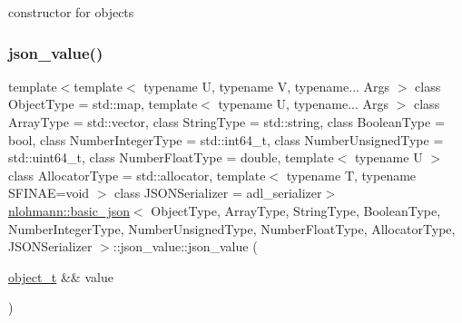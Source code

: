 constructor for objects 

\mbox{\label{unionnlohmann_1_1basic__json_1_1json__value_a82815d53bd7c983995fbcbe85131a110}} 
\subsubsection{\texorpdfstring{json\_value()}{json\_value()}\hspace{0.1cm}{\footnotesize\ttfamily [10/12]}}
{\footnotesize\ttfamily template$<$template$<$ typename U, typename V, typename... Args $>$ class Object\+Type = std\+::map, template$<$ typename U, typename... Args $>$ class Array\+Type = std\+::vector, class String\+Type  = std\+::string, class Boolean\+Type  = bool, class Number\+Integer\+Type  = std\+::int64\+\_\+t, class Number\+Unsigned\+Type  = std\+::uint64\+\_\+t, class Number\+Float\+Type  = double, template$<$ typename U $>$ class Allocator\+Type = std\+::allocator, template$<$ typename T, typename S\+F\+I\+N\+A\+E=void $>$ class J\+S\+O\+N\+Serializer = adl\+\_\+serializer$>$ \\
\mbox{\hyperlink{classnlohmann_1_1basic__json}{nlohmann\+::basic\+\_\+json}}$<$ Object\+Type, Array\+Type, String\+Type, Boolean\+Type, Number\+Integer\+Type, Number\+Unsigned\+Type, Number\+Float\+Type, Allocator\+Type, J\+S\+O\+N\+Serializer $>$\+::json\+\_\+value\+::json\+\_\+value (\begin{DoxyParamCaption}\item[{\mbox{\hyperlink{classnlohmann_1_1basic__json_a5e48a7893520e1314bf0c9723e26ea2a}{object\+\_\+t}} \&\&}]{value }\end{DoxyParamCaption})\hspace{0.3cm}{\ttfamily [inline]}}



